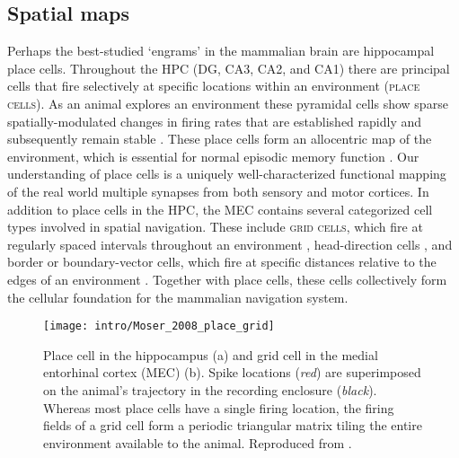\subsection{Spatial maps}
\label{sec:intro:memory:spatial_maps}
Perhaps the best-studied `engrams' in the mammalian brain are hippocampal place cells.
Throughout the \ac{HPC} (\ac{DG}, CA3, CA2, and CA1) there are principal cells that fire selectively at specific locations within an environment (\textsc{place cells}).
As an animal explores an environment these pyramidal cells show sparse spatially-modulated changes in firing rates that are established rapidly and subsequently remain stable \citep{O'Keefe1971, Thompson1990, Frank2004}.
These place cells form an allocentric map of the environment, which is essential for normal episodic memory function \citep{Smith2006c, Nakazawa2004, Buzsaki2013}.
Our understanding of place cells is a uniquely well-characterized functional mapping of the real world multiple synapses from both sensory and motor cortices.
In addition to place cells in the \ac{HPC}, the \ac{MEC} contains several categorized cell types involved in spatial navigation.
These include \textsc{grid cells}, which fire at regularly spaced intervals throughout an environment \citep{Hafting2005, Moser2014a}, head-direction cells \citep{Taube2007}, and border or boundary-vector cells, which fire at specific distances relative to the edges of an environment \citep{Solstad2008}.
Together with place cells, these cells collectively form the cellular foundation for the mammalian navigation system.

\begin{figure}
	\centering
	\texttt{[image: intro/Moser\_2008\_place\_grid]}
	\caption[Place cell in the hippocampus and grid cell in the MEC]{Place cell in the hippocampus (a) and grid cell in the medial entorhinal cortex (MEC) (b).
	Spike locations (\emph{red}) are superimposed on the animal’s trajectory in the recording enclosure (\emph{black}).
	Whereas most place cells have a single firing location, the firing fields of a grid cell form a periodic triangular matrix tiling the entire environment available to the animal.
	Reproduced from \citet{Moser2008}.}
	\label{fig:intro:memory:place_grid}
\end{figure}

